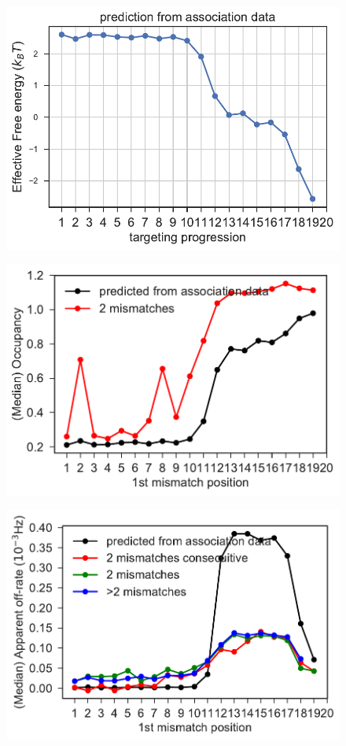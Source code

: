 \documentclass[a4paper,twoside]{revtex4-1}
\begin{document}
\begin{figure}[H]
\includegraphics[scale=0.5]{fig5_10_10_2018.pdf}
\end{figure}

\begin{figure}[H]
\includegraphics[scale=0.5]{fig6_10_10_2018.pdf}
\end{figure}

\begin{figure}[H]
\includegraphics[scale=0.5]{fig7_10_10_2018.pdf}
\end{figure}
\end{document}
